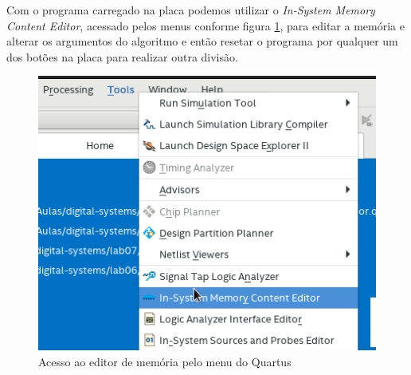 \documentclass[a4paper, 12pt]{article}
\begin{document}
Com o programa carregado na placa podemos utilizar o \textit{In-System Memory Content Editor}, acessado pelos menus conforme
figura \ref{fig:editor}, para editar a memória e alterar os argumentos do algoritmo e então
resetar o programa por qualquer um dos botões na placa para realizar outra divisão.

\begin{figure}[ht]
	\centering
	\includegraphics[width=.4\textwidth]{./images/memory_editor.png}
	\caption{Acesso ao editor de memória pelo menu do Quartus}
	\label{fig:editor}
\end{figure}
\end{document}
